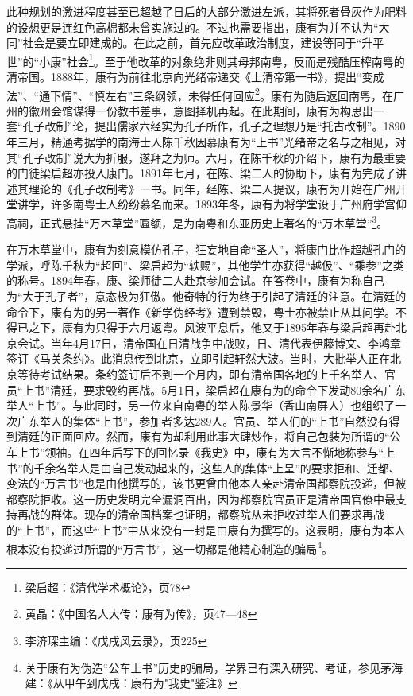 此种规划的激进程度甚至已超越了日后的大部分激进左派，其将死者骨灰作为肥料的设想更是连红色高棉都未曾实施过的。不过也需要指出，康有为并不认为“大同”社会是要立即建成的。在此之前，首先应改革政治制度，建设等同于“升平世”的“小康”社会\footnote{梁启超：《清代学术概论》，页78}。至于他改革的对象绝非则其母邦南粤，反而是残酷压榨南粤的清帝国。1888年，康有为前往北京向光绪帝递交《上清帝第一书》，提出“变成法”、“通下情”、“慎左右”三条纲领，未得任何回应\footnote{黄晶：《中国名人大传：康有为传》，页47—48}。康有为随后返回南粤，在广州的徽州会馆谋得一份教书差事，意图择机再起。在此期间，康有为构思出一套“孔子改制”论，提出儒家六经实为孔子所作，孔子之理想乃是“托古改制”。1890年三月，精通考据学的南海士人陈千秋因慕康有为“上书”光绪帝之名与之相见，对其“孔子改制”说大为折服，遂拜之为师。六月，在陈千秋的介绍下，康有为最重要的门徒梁启超亦投入康门。1891年七月，在陈、梁二人的协助下，康有为完成了讲述其理论的《孔子改制考》一书。同年，经陈、梁二人提议，康有为开始在广州开堂讲学，许多南粤士人纷纷慕名而来。1893年冬，康有为将学堂设于广州府学宫仰高祠，正式悬挂“万木草堂”匾额，是为南粤和东亚历史上著名的“万木草堂”\footnote{李济琛主编：《戊戌风云录》，页225}。

在万木草堂中，康有为刻意模仿孔子，狂妄地自命“圣人”，将康门比作超越孔门的学派，呼陈千秋为“超回”、梁启超为“轶赐”，其他学生亦获得“越伋”、“乘参”之类的称号。1894年春，康、梁师徒二人赴京参加会试。在答卷中，康有为称自己为“大于孔子者”，意态极为狂傲。他奇特的行为终于引起了清廷的注意。在清廷的命令下，康有为的另一著作《新学伪经考》遭到禁毁，粤士亦被禁止从其问学。不得已之下，康有为只得于六月返粤。风波平息后，他又于1895年春与梁启超再赴北京会试。当年4月17日，清帝国在日清战争中战败，日、清代表伊藤博文、李鸿章签订《马关条约》。此消息传到北京，立即引起轩然大波。当时，大批举人正在北京等待考试结果。条约签订后不到一个月内，即有清帝国各地的上千名举人、官员“上书”清廷，要求毁约再战。5月1日，梁启超在康有为的命令下发动80余名广东举人“上书”。与此同时，另一位来自南粤的举人陈景华（香山南屏人）也组织了一次广东举人的集体“上书”，参加者多达289人。官员、举人们的“上书”自然没有得到清廷的正面回应。然而，康有为却利用此事大肆炒作，将自己包装为所谓的“公车上书”领袖。在四年后写下的回忆录《我史》中，康有为大言不惭地称参与“上书”的千余名举人是由自己发动起来的，这些人的集体“上呈”的要求拒和、迁都、变法的“万言书”也是由他撰写的，该书更曾由他本人亲赴清帝国都察院投递，但被都察院拒收。这一历史发明完全漏洞百出，因为都察院官员正是清帝国官僚中最支持再战的群体。现存的清帝国档案也证明，都察院从未拒收过举人们要求再战的“上书”，而这些“上书”中从来没有一封是由康有为撰写的。这表明，康有为本人根本没有投递过所谓的“万言书”，这一切都是他精心制造的骗局\footnote{关于康有为伪造“公车上书”历史的骗局，学界已有深入研究、考证，参见茅海建：《从甲午到戊戌：康有为"我史"鉴注》}。

